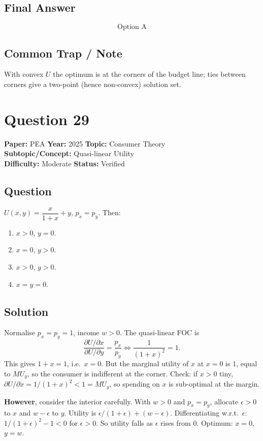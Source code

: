\documentclass[11pt]{article}
\begin{document}
\subsection*{Final Answer}
\[
\boxed{\text{Option A}}
\]

\subsection*{Common Trap / Note}
With convex $U$ the optimum is at the corners of the budget line; ties between corners give a two-point (hence non-convex) solution set.

\section*{Question 29}
\textbf{Paper:} PEA \quad \textbf{Year:} 2025 \quad \textbf{Topic:} Consumer Theory \\
\textbf{Subtopic/Concept:} Quasi-linear Utility \\
\textbf{Difficulty:} Moderate \quad \textbf{Status:} Verified

\subsection*{Question}
$U(x,y) = \dfrac{x}{1+x} + y$, $p_x = p_y$. Then:

\begin{enumerate}[label=(\Alph*)]
\item $x > 0$, $y = 0$.
\item $x = 0$, $y > 0$.
\item $x > 0$, $y > 0$.
\item $x = y = 0$.
\end{enumerate}

\subsection*{Solution}
Normalise $p_x = p_y = 1$, income $w > 0$. The quasi-linear FOC is
\[
\frac{\partial U/\partial x}{\partial U/\partial y} = \frac{p_x}{p_y} \iff \frac{1}{(1+x)^2} = 1.
\]
This gives $1 + x = 1$, i.e.\ $x = 0$. But the marginal utility of $x$ at $x = 0$ is $1$, equal to $MU_y$, so the consumer is indifferent at the corner. Check: if $x > 0$ tiny, $\partial U/\partial x = 1/(1+x)^2 < 1 = MU_y$, so spending on $x$ is sub-optimal at the margin.

\textbf{However}, consider the interior carefully. With $w > 0$ and $p_x = p_y$, allocate $\epsilon > 0$ to $x$ and $w - \epsilon$ to $y$. Utility is $\epsilon/(1+\epsilon) + (w-\epsilon)$. Differentiating w.r.t.\ $\epsilon$: $1/(1+\epsilon)^2 - 1 < 0$ for $\epsilon > 0$. So utility falls as $\epsilon$ rises from $0$. Optimum: $x = 0$, $y = w$.
\end{document}
